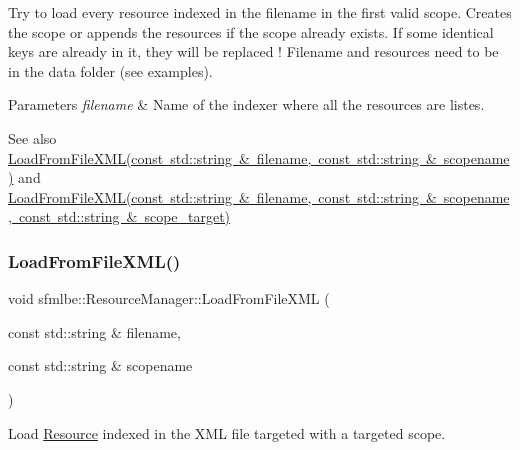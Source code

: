 Try to load every resource indexed in the filename in the first valid scope. Creates the scope or appends the resources if the scope already exists. If some identical keys are already in it, they will be replaced ! Filename and resources need to be in the data folder (see examples). 
\begin{DoxyParams}{Parameters}
{\em filename} & Name of the indexer where all the resources are listes. \\
\hline
\end{DoxyParams}
\begin{DoxySeeAlso}{See also}
\mbox{\hyperlink{classsfmlbe_1_1_resource_manager_a2da403b4057837350f5e09f0a33b80dd}{Load\+From\+File\+X\+M\+L(const std\+::string \& filename, const std\+::string \& scopename)}} and \mbox{\hyperlink{classsfmlbe_1_1_resource_manager_a99707b50bdf61ac1daadd65027a1ae2b}{Load\+From\+File\+X\+M\+L(const std\+::string \& filename, const std\+::string \& scopename, const std\+::string \& scope\+\_\+target)}} 
\end{DoxySeeAlso}
\mbox{\label{classsfmlbe_1_1_resource_manager_a2da403b4057837350f5e09f0a33b80dd}} 
\subsubsection{\texorpdfstring{Load\+From\+File\+X\+M\+L()}{LoadFromFileXML()}\hspace{0.1cm}{\footnotesize\ttfamily [2/3]}}
{\footnotesize\ttfamily void sfmlbe\+::\+Resource\+Manager\+::\+Load\+From\+File\+X\+ML (\begin{DoxyParamCaption}\item[{const std\+::string \&}]{filename,  }\item[{const std\+::string \&}]{scopename }\end{DoxyParamCaption})}



Load \mbox{\hyperlink{classsfmlbe_1_1_resource}{Resource}} indexed in the X\+ML file targeted with a targeted scope. 

